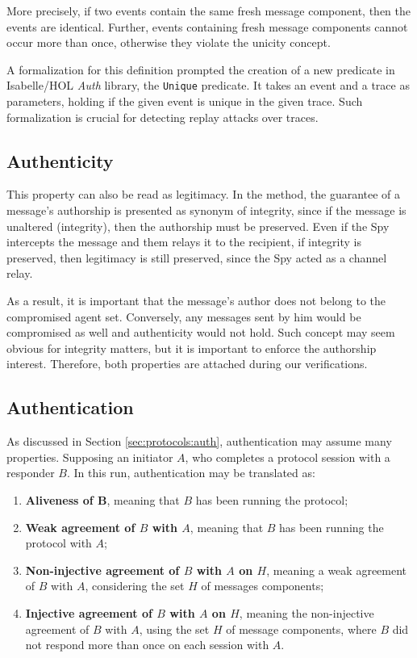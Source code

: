 More precisely, if two events contain the same fresh message component, then the events are identical. Further, events containing fresh message components cannot occur more than once, otherwise they violate the unicity concept.

A formalization for this definition prompted the creation of a new predicate in Isabelle/HOL \textit{Auth} library, the \texttt{Unique} predicate. It takes an event and a trace as parameters, holding if the given event is unique in the given trace. Such formalization is crucial for detecting replay attacks over traces.




\subsection{Authenticity}
This property can also be read as legitimacy. In the method, the guarantee of a message's authorship is presented as synonym of integrity, since if the message is unaltered (integrity), then the authorship must be preserved. Even if the Spy intercepts the message and them relays it to the recipient, if integrity is preserved, then legitimacy is still preserved, since the Spy acted as a channel relay.

As a result, it is important that the message's author does not belong to the compromised agent set. Conversely, any messages sent by him would be compromised as well and authenticity would not hold. Such concept may seem obvious for integrity matters, but it is important to enforce the authorship interest. Therefore, both properties are attached during our verifications.





\subsection{Authentication}
As discussed in Section \ref{sec:protocols:auth}, authentication may assume many properties. Supposing an initiator $A$, who completes a protocol session with a responder $B$. In this run, authentication may be translated as:

\begin{enumerate}
  \item \textbf{Aliveness of B}, meaning that $B$ has been running the protocol;
  \item \textbf{Weak agreement of $B$ with $A$}, meaning that $B$ has been running the protocol with $A$;
  \item \textbf{Non-injective agreement of $B$ with $A$ on $H$}, meaning a weak agreement of $B$ with $A$, considering the set $H$ of messages components;
  \item \textbf{Injective agreement of $B$ with $A$ on $H$}, meaning the non-injective agreement of $B$ with $A$, using the set $H$ of message components, where $B$ did not respond more than once on each session with $A$.
\end{enumerate}

